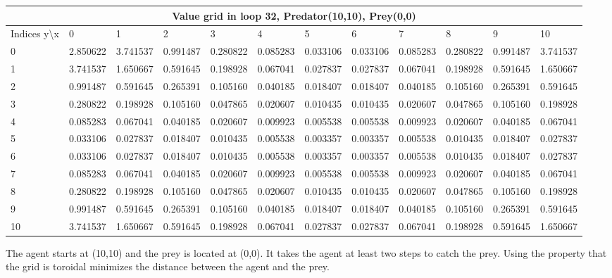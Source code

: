 \documentclass{article}
\begin{document}
\begin{center}
\scalebox{0.7}
	{
	\begin{tabular}{ |l | l | l | l | l | l | l | l | l | l | l | l|}
	\hline
	\multicolumn{12}{|c|}{Value grid in loop 32, Predator(10,10), Prey(0,0)}\\
	\hline
	Indices y\textbackslash x &0 & 1 & 2 & 3 & 4 & 5 & 6 & 7 & 8 & 9 & 10 \\ 

\hline
0 & \cellcolor{red!40} 2.850622 & 3.741537 & 0.991487 & 0.280822 & 0.085283 & 0.033106 & 0.033106 & 0.085283 & 0.280822 & 0.991487 & 3.741537 \\
1 & 3.741537 & 1.650667 & 0.591645 & 0.198928 & 0.067041 & 0.027837 & 0.027837 & 0.067041 & 0.198928 & 0.591645 & 1.650667 \\
2 & 0.991487 & 0.591645 & 0.265391 & 0.105160 & 0.040185 & 0.018407 & 0.018407 & 0.040185 & 0.105160 & 0.265391 & 0.591645 \\
3 & 0.280822 & 0.198928 & 0.105160 & 0.047865 & 0.020607 & 0.010435 & 0.010435 & 0.020607 & 0.047865 & 0.105160 & 0.198928 \\
4 & 0.085283 & 0.067041 & 0.040185 & 0.020607 & 0.009923 & 0.005538 & 0.005538 & 0.009923 & 0.020607 & 0.040185 & 0.067041 \\
5 & 0.033106 & 0.027837 & 0.018407 & 0.010435 & 0.005538 & 0.003357 & 0.003357 & 0.005538 & 0.010435 & 0.018407 & 0.027837 \\
6 & 0.033106 & 0.027837 & 0.018407 & 0.010435 & 0.005538 & 0.003357 & 0.003357 & 0.005538 & 0.010435 & 0.018407 & 0.027837 \\
7 & 0.085283 & 0.067041 & 0.040185 & 0.020607 & 0.009923 & 0.005538 & 0.005538 & 0.009923 & 0.020607 & 0.040185 & 0.067041 \\
8 & 0.280822 & 0.198928 & 0.105160 & 0.047865 & 0.020607 & 0.010435 & 0.010435 & 0.020607 & 0.047865 & 0.105160 & 0.198928 \\
9 & 0.991487 & 0.591645 & 0.265391 & 0.105160 & 0.040185 & 0.018407 & 0.018407 & 0.040185 & 0.105160 & 0.265391 & 0.591645 \\
10 & 3.741537 & 1.650667 & 0.591645 & 0.198928 & 0.067041 & 0.027837 & 0.027837 & 0.067041 & 0.198928 & 0.591645 & \cellcolor{green!40}1.650667 \\

\hline
	\end{tabular}
	}
\end{center}

The agent starts at (10,10) and the prey is located at (0,0). It takes the agent at least two steps to catch the prey. Using the property that the grid is toroidal minimizes the distance between the agent and the prey. 
\end{document}
